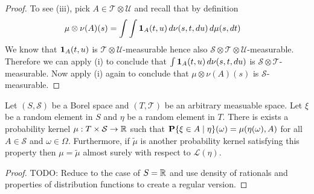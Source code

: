 \begin{proof}
To see (iii), pick $A \in \mathcal{T} \otimes \mathcal{U}$ and recall
that by definition
\begin{align*}
\mu \otimes \nu (A) (s) &= \int \int \textbf{1}_{A}(t,u) \,
d\nu(s,t,du) \, d\mu(s, dt)
\end{align*}
We know that $\textbf{1}_{A}(t,u)$ is $\mathcal{T} \otimes
\mathcal{U}$-measurable hence also $\mathcal{S} \otimes \mathcal{T} \otimes
\mathcal{U}$-measurable.  Therefore we can apply (i) to conclude that $\int \textbf{1}_{A}(t,u) \,
d\nu(s,t,du)$ is $\mathcal{S} \otimes \mathcal{T}$-measurable.  Now
apply (i) again to conclude that $\mu \otimes \nu (A) (s)$ is $\mathcal{S}$-measurable.
\end{proof}

\begin{thm}\label{ExistenceConditionalDistribution}Let $(S, \mathcal{S})$ be a Borel space and
  $(T, \mathcal{T})$ be an arbitrary measuable space.  Let $\xi$ be a
  random element in $S$ and $\eta$ be a random element in $T$.  There
  is exists a probability kernel $\mu : T \times \mathcal{S} \to
  \mathbb{R}$ such that $\textbf{P}\{\xi \in A \mid \eta \}(\omega) =
  \mu(\eta(\omega), A)$ for all $A \in \mathcal{S}$ and $\omega \in
  \Omega$.  Furthermore, if $\tilde{\mu}$ is another probability
  kernel satisfying this property then $\mu = \tilde{\mu}$ almost
  surely with respect to $\mathcal{L}(\eta)$.
\end{thm}
\begin{proof}
TODO:  Reduce to the case of $S = \mathbb{R}$ and use density of rationals
and properties of distribution functions to create a regular version.
\end{proof}

